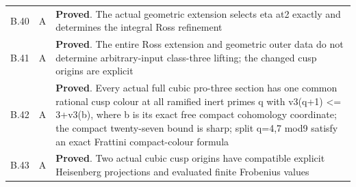 \begin{longtable}{@{}p{}p{}p{}@{}}
B.40 & A & \textbf{Proved}. The actual geometric extension selects eta at2 exactly and determines the integral Ross refinement \\
B.41 & A & \textbf{Proved}. The entire Ross extension and geometric outer data do not determine arbitrary-input class-three lifting; the changed cusp origins are explicit \\
B.42 & A & \textbf{Proved}. Every actual full cubic pro-three section has one common rational cusp colour at all ramified inert primes q with v3(q+1) \textless{}= 3+v3(b), where b is its exact free compact cohomology coordinate; the compact twenty-seven bound is sharp; split q=4,7 mod9 satisfy an exact Frattini compact-colour formula \\
B.43 & A & \textbf{Proved}. Two actual cubic cusp origins have compatible explicit Heisenberg projections and evaluated finite Frobenius values \\
\bottomrule
\end{longtable}
\endgroup
